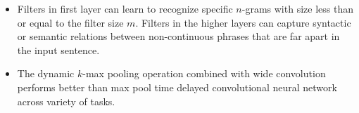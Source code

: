 \documentclass{article}
\begin{document}
\begin{itemize}
    \item Filters in first layer can learn to recognize specific $n$-grams with size less than or equal to the filter size $m$. Filters in the higher layers can capture syntactic or semantic relations between non-continuous phrases that are far apart in the input sentence.  
    \item The dynamic $k$-max pooling operation combined with wide convolution performs better than max pool time delayed convolutional neural network across variety of tasks.

\end{itemize}
\end{document}
